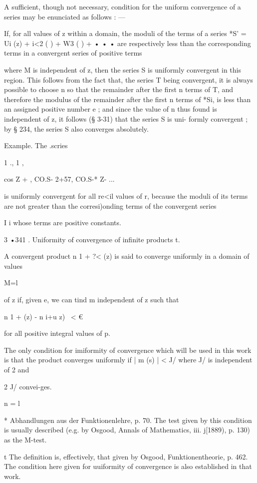 A sufficient, though not necessary, condition for the uniform
convergence of a series may be enunciated as follows : —

If, for all values of z within a domain, the moduli of the terms of a
series *S' = Ui (z) + i<2 ( ) + W3 ( ) + • • • are respectively less
than the corresponding terms in a convergent series of positive terms

where M is independent of z, then the series S is uniformly convergent
in this region. This follows from the fact that, the series T being
convergent, it is always possible to choose n so that the remainder
after the first n terms of T, and therefore the modulus of the
remainder after the first n terms of *Si, is less than an assigned
positive number e ; and since the value of n thus found is independent
of z, it follows (§ 3-31) that the series S is uni- formly convergent
; by § 234, the series S also converges absolutely.

Example. The .scries

1 ., 1 ,

cos Z + , CO.S- 2+57, CO.S-* Z- ...

is uniformly convergent for all re<il values of r, because the moduli
of its terms are not greater than the corresi)onding terms of the
convergent series

I i whose terms are positive constants.

3 •341 . Uniformity of convergence of infinite products t.

A convergent product n 1 + ?< (z) is said to converge uniformly in a
domain of values

M=l

of z if, given e, we can tind m independent of z such that

n 1 + (z) - n i+u z) \ < €

for all positive integral values of p.

The only condition for imiformity of convergence which will be used in
this work is that the product converges uniformly if | m (s) | < J/
where J/ is independent of 2 and

2 J/ convei-ges.

n = l

* Abhandlungen aus der Funktionenlehre, p. 70. The test given by this
condition is usually described (e.g. by Osgood, Annals of Mathematics,
iii. j[1889), p. 130) as the M-test.

t The definition is, effectively, that given by Osgood,
Funktionentheorie, p. 462. The condition here given for uuiformity of
convergence is also established in that work.

